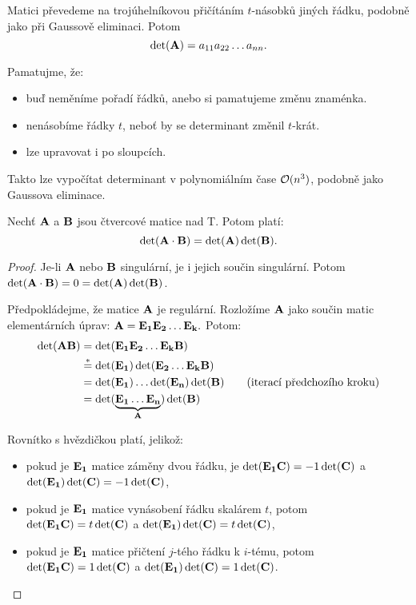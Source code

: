\begin{remark}
    Matici převedeme na trojúhelníkovou přičítáním $t$-násobků jiných řádku,
    podobně jako při Gaussově eliminaci. Potom $$\det(\mathbf{A}) = a_{11}a_{22}\dots
    a_{nn}.$$
    
    Pamatujme, že:
    \begin{itemize}
        \item buď neměníme pořadí řádků, anebo si pamatujeme změnu znaménka.
        \item nenásobíme řádky $t$, neboť by se determinant změnil $t$-krát.
        \item lze upravovat i po sloupcích.
    \end{itemize}

    Takto lze vypočítat determinant v polynomiálním čase $\mathcal{O}(n^3)$, podobně 
    jako Gaussova eliminace.
\end{remark}

\begin{theorem}
    \label{th:detabdetadetb}
    Nechť $\mathbf{A}$ a $\mathbf{B}$ jsou čtvercové matice nad T. Potom platí:
    $$ \det(\mathbf{A}\cdot\mathbf{B}) = \det(\mathbf{A}) \det(\mathbf{B}).$$
\end{theorem}

\begin{proof}
    Je-li $\mathbf{A}$ nebo $\mathbf{B}$ singulární, je i jejich součin singulární. Potom
    $\det(\mathbf{A}\cdot \mathbf{B}) = 0 = \det(\mathbf{A})\det(\mathbf{B})$.

    Předpokládejme, že matice $\mathbf{A}$ je regulární. Rozložíme $\mathbf{A}$
    jako součin matic elementárních úprav: 
    $\mathbf{A} = \mathbf{E_1}\mathbf{E_2} \dots \mathbf{E_k}.$ Potom:
    \begin{align*} 
        \det(\mathbf{A}\mathbf{B}) &= \det(\mathbf{E_1}\mathbf{E_2}\dots\mathbf{E_k}\mathbf{B}) \\
                     &\stackrel{*}{=} \det(\mathbf{E_1}) 
                        \det(\mathbf{E_2}\dots\mathbf{E_k}\mathbf{B}) \\
                        &= \det(\mathbf{E_1}) \dots \det(\mathbf{E_n}) \det(\mathbf{B})
                        \tag{iterací předchozího kroku} \\
                        &= \det(\underbrace{\mathbf{E_1}\dots\mathbf{E_n}}_{\mathbf{A}})
                        \det(\mathbf{B})
    \end{align*}

    Rovnítko s hvězdičkou platí, jelikož:
    \begin{itemize}
        \item pokud je $\mathbf{E_1}$ matice záměny dvou řádku, je 
            $\det(\mathbf{E_1}\mathbf{C}) = -1\det(\mathbf{C})$ a $\det(\mathbf{E_1})\det(\mathbf{C}) = 
            -1\det(\mathbf{C})$,
        \item pokud je $\mathbf{E_1}$ matice vynásobení řádku skalárem $t$, potom
            $\det(\mathbf{E_1}\mathbf{C}) = t\det(\mathbf{C})$ a $\det(\mathbf{E_1})\det(\mathbf{C}) = 
            t\det(\mathbf{C})$,
        \item pokud je $\mathbf{E_1}$ matice přičtení $j$-tého řádku k $i$-tému,
            potom
            $\det(\mathbf{E_1}\mathbf{C}) = 1\det(\mathbf{C})$ a $\det(\mathbf{E_1})\det(\mathbf{C}) = 
            1\det(\mathbf{C})$.
    \end{itemize}
\end{proof}

